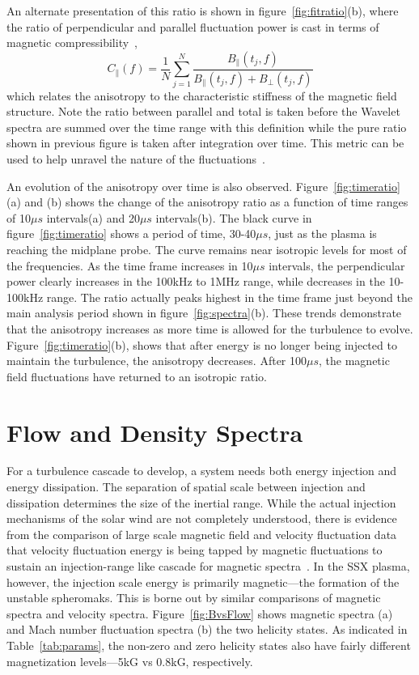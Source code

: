 \documentclass[aip,prl,amsmath,amssymb,reprint,superscriptaddress]{revtex4-1} %
\begin{document}
An alternate presentation of this ratio is shown in figure~\ref{fig:fitratio}(b), where the ratio of perpendicular and parallel fluctuation power is cast in terms of magnetic compressibility~\cite{kiyani13},
\begin{equation}
C_{\parallel}(f) = \frac{1}{N}\sum^{N}_{j=1}\frac{B_{\parallel}(t_{j},f)}{B_{\parallel}(t_{j},f)+B_{\perp}(t_{j},f)}
\label{eq:magcompress}
\end{equation}
which relates the anisotropy to the characteristic stiffness of the magnetic field structure. Note the ratio between parallel and total is taken before the Wavelet spectra are summed over the time range with this definition while the pure ratio shown in previous figure is taken after integration over time. This metric can be used to help unravel the nature of the fluctuations~\cite{tenbarge12,kiyani13}.

An evolution of the anisotropy over time is also observed. Figure~\ref{fig:timeratio}(a) and (b) shows the change of the anisotropy ratio as a function of time ranges of 10$\mu s$ intervals(a) and 20$\mu s$ intervals(b). The black curve in figure~\ref{fig:timeratio} shows a period of time, 30-40$\mu s$, just as the plasma is reaching the midplane probe. The curve remains near isotropic levels for most of the frequencies. As the time frame increases in 10$\mu s$ intervals, the perpendicular power clearly increases in the 100kHz to 1MHz range, while decreases in the 10-100kHz range. The ratio actually peaks highest in the time frame just beyond the main analysis period shown in figure~\ref{fig:spectra}(b). These trends demonstrate that the anisotropy increases as more time is allowed for the turbulence to evolve. Figure~\ref{fig:timeratio}(b), shows that after energy is no longer being injected to maintain the turbulence, the anisotropy decreases. After 100$\mu s$, the magnetic field fluctuations have returned to an isotropic ratio.

\section{Flow and Density Spectra}\label{sec:flowdens}

For a turbulence cascade to develop, a system needs both energy injection and energy dissipation. The separation of spatial scale between injection and dissipation determines the size of the inertial range. While the actual injection mechanisms of the solar wind are not completely understood, there is evidence from the comparison of large scale magnetic field and velocity fluctuation data that velocity fluctuation energy is being tapped by magnetic fluctuations to sustain an injection-range like cascade for magnetic spectra~\cite{roberts10}. In the SSX plasma, however, the injection scale energy is primarily magnetic---the formation of the unstable spheromaks. This is borne out by similar comparisons of magnetic spectra and velocity spectra. Figure~\ref{fig:BvsFlow} shows magnetic spectra (a) and Mach number fluctuation spectra (b) the two helicity states. As indicated in Table~\ref{tab:params}, the non-zero and zero helicity states also have fairly different magnetization levels---5kG vs 0.8kG, respectively.
\end{document}
